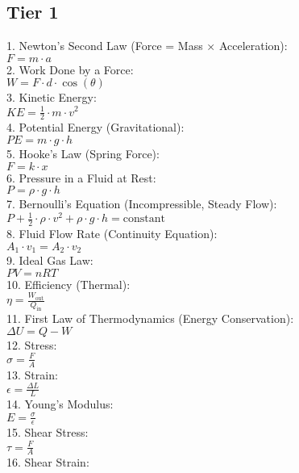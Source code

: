 \documentclass{article}
\begin{document}
\begin{multicols}{2}

\section*{Tier 1}
1. Newton's Second Law (Force = Mass × Acceleration): \\
   \( F = m \cdot a \) \\
2. Work Done by a Force: \\
   \( W = F \cdot d \cdot \cos(\theta) \) \\
3. Kinetic Energy: \\
   \( KE = \frac{1}{2} \cdot m \cdot v^2 \) \\
4. Potential Energy (Gravitational): \\
   \( PE = m \cdot g \cdot h \) \\
5. Hooke's Law (Spring Force): \\
   \( F = k \cdot x \) \\
6. Pressure in a Fluid at Rest: \\
   \( P = \rho \cdot g \cdot h \) \\
7. Bernoulli's Equation (Incompressible, Steady Flow): \\
   \( P + \frac{1}{2} \cdot \rho \cdot v^2 + \rho \cdot g \cdot h = \text{constant} \) \\
8. Fluid Flow Rate (Continuity Equation): \\
   \( A_1 \cdot v_1 = A_2 \cdot v_2 \) \\
9. Ideal Gas Law: \\
   \( PV = nRT \) \\
10. Efficiency (Thermal): \\
    \( \eta = \frac{W_{\text{out}}}{Q_{\text{in}}} \) \\
11. First Law of Thermodynamics (Energy Conservation): \\
    \( \Delta U = Q - W \) \\
12. Stress: \\
    \( \sigma = \frac{F}{A} \) \\
13. Strain: \\
    \( \epsilon = \frac{\Delta L}{L} \) \\
14. Young's Modulus: \\
    \( E = \frac{\sigma}{\epsilon} \) \\
15. Shear Stress: \\
    \( \tau = \frac{F}{A} \) \\
16. Shear Strain: \\

\end{multicols}
\end{document}
